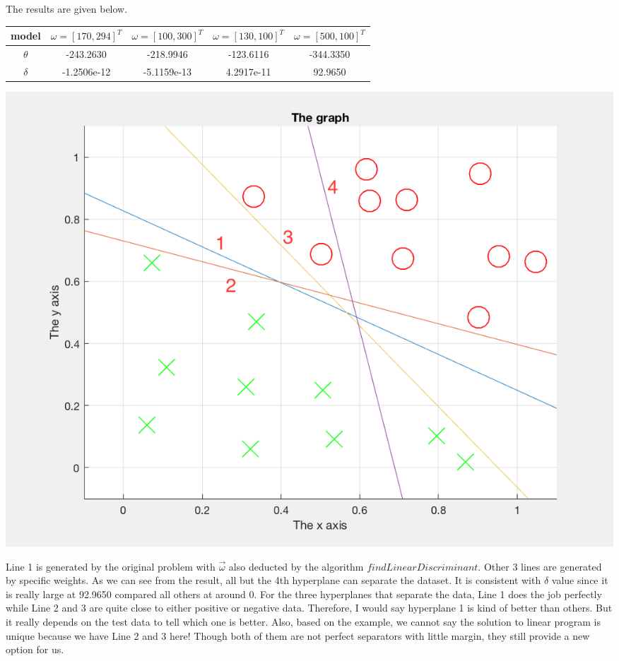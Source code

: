 \begin{enumerate}
\begin{enumerate}
	The results are given below.
	\begin{center}
	\begin{tabular}{ | c | c | c | c | c | }
	\hline
	model & $\omega = [170, 294]^T$ & $\omega = [100, 300]^T$ & $\omega = [130, 100]^T$ & $\omega = [500, 100]^T$ \\
	\hline
	$\theta$ & -243.2630 & -218.9946 & -123.6116 & -344.3350\\
	\hline
	$\delta$ & -1.2506e-12 & -5.1159e-13 & 4.2917e-11& 92.9650\\
	\hline
	\end{tabular}
	\includegraphics[scale = 0.65]{p3b4}\\
	\end{center}
	Line 1 is generated by the original problem with $\vec{\omega}$ also deducted by the algorithm $findLinearDiscriminant$. Other 3 lines are generated by specific weights. As we can see from the result, all but the 4th hyperplane can separate the dataset. It is consistent with $\delta$ value since it is really large at 92.9650 compared all others at around 0. For the three hyperplanes that separate the data, Line 1 does the job perfectly while Line 2 and 3 are quite close to either positive or negative data. Therefore, I would say hyperplane 1 is kind of better than others. But it really depends on the test data to tell which one is better. Also, based on the example, we cannot say the solution to linear program is unique because we have Line 2 and 3 here! Though both of them are not perfect separators with little margin, they still provide a new option for us. 

	\end{enumerate}

\end{enumerate}



